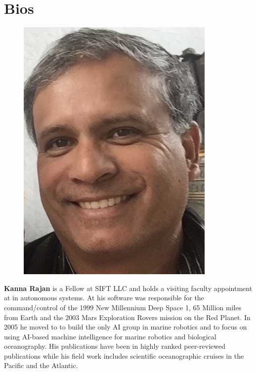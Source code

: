 \section{Bios}
\label{sec:bios}

\parbox{6.3in}{
\begin{figure} %
    \vspace{-\intextsep}
    \hspace*{-.35\columnsep}\includegraphics[scale=0.4]{fig/KRajan.jpg}
\end{figure}
\textbf{Kanna Rajan} is a Fellow at SIFT LLC and holds a visiting
faculty appointment at \univ in autonomous systems. At \nas his
software was responsible for the command/control of the 1999 New
Millennium Deep Space 1, 65 Million miles from Earth and the 2003 Mars
Exploration Rovers mission on the Red Planet. In 2005 he moved to \mba
to build the only AI group in marine robotics and to focus on using
AI-based machine intelligence for marine robotics and biological
oceanography. His publications have been in highly ranked
peer-reviewed publications while his field work includes scientific
oceanographic cruises in the Pacific and the Atlantic.
\\
}

